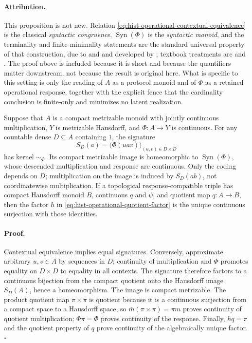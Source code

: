 \paragraph{Attribution.}
This proposition is not new.  Relation
\eqref{eq:hist-operational-contextual-equivalence} is the classical
\emph{syntactic congruence}, \(\operatorname{Syn}(\Phi)\) is the
\emph{syntactic monoid}, and the terminality and finite-minimality statements
are the standard universal property of that construction, due to
\citet{Myhill1957} and \citet{Nerode1958} and developed by
\citet{Schutzenberger1965}; textbook treatments are
\citet[Ch.~B.II]{Eilenberg1976} and \citet[Ch.~2]{Pin1986}.  The proof above is
included because it is short and because the quantifiers matter downstream, not
because the result is original here.  What is specific to this setting is only
the reading of \(A\) as a protocol monoid and of \(\Phi\) as a retained
operational response, together with the explicit fence that the cardinality
conclusion is finite-only and minimizes no latent realization.

Suppose that \(A\) is a compact metrizable monoid with jointly continuous
multiplication, \(Y\) is metrizable Hausdorff, and \(\Phi:A\to Y\) is
continuous.  For any countable dense \(D\subseteq A\) containing \(1\), the
signature
\begin{equation}
S_D(a)=\bigl(\Phi(uav)\bigr)_{(u,v)\in D\times D}
\label{eq:hist-operational-countable-signature}
\end{equation}
has kernel \(\sim_\Phi\).  Its compact metrizable image is homeomorphic to
\(\operatorname{Syn}(\Phi)\), whose descended multiplication and response
are continuous.  Only the coding depends on \(D\); multiplication on the
image is induced by \(S_D(ab)\), not coordinatewise multiplication.  If a
topological response-compatible triple has compact Hausdorff monoid \(B\),
continuous \(q\) and \(\psi\), and quotient map \(q:A\to B\), then the
factor \(h\) in \eqref{eq:hist-operational-quotient-factor} is the unique
continuous surjection with those identities.  

\paragraph{Proof.}
Contextual equivalence implies equal signatures.  Conversely, approximate
arbitrary \(u,v\in A\) by sequences in \(D\); continuity of multiplication
and \(\Phi\) promotes equality on \(D\times D\) to equality in all contexts.
The signature therefore factors to a continuous bijection from the compact
quotient onto the Hausdorff image \(S_D(A)\), hence a homeomorphism.  The
image is compact metrizable.  The product quotient map
\(\pi\times\pi\) is quotient because it is a continuous surjection from a
compact space to a Hausdorff space, so
\(\bar m(\pi\times\pi)=\pi m\) proves continuity of quotient
multiplication; \(\bar\Phi\pi=\Phi\) proves continuity of the response.
Finally, \(hq=\pi\) and the quotient property of \(q\) prove continuity of
the algebraically unique factor.  \(\square\)

